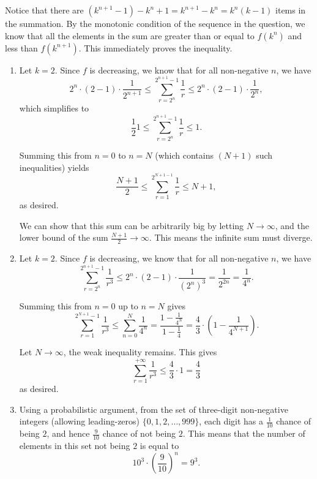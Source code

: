 \Question{\currfilebase}

Notice that there are \((k^{n + 1} - 1) - k^n + 1 = k^{n + 1} - k^n = k^n (k - 1)\) items in the summation. By the monotonic condition of the sequence in the question, we know that all the elements in the sum are greater than or equal to \(f(k^n)\) and less than \(f(k^{n + 1})\). This immediately proves the inequality.

\begin{enumerate}
    \item Let \(k = 2\). Since \(f\) is decreasing, we know that for all non-negative \(n\), we have
          \[
              2^n \cdot (2 - 1) \cdot \frac{1}{2^{n + 1}} \leq \sum_{r = 2^n}^{2^{n + 1} - 1} \frac{1}{r} \leq 2^n \cdot (2 - 1) \cdot \frac{1}{2^{n}},
          \]
          which simplifies to
          \[
              \frac{1}{2} 1 \leq \sum_{r = 2^n}^{2^{n + 1} - 1} \frac{1}{r} \leq 1.
          \]

          Summing this from \(n = 0\) to \(n = N\) (which contains \((N + 1)\) such inequalities) yields
          \[
              \frac{N + 1}{2} \leq \sum_{r = 1}^{2^{N + 1 - 1}} \frac{1}{r} \leq N + 1,
          \]
          as desired.

          We can show that this sum can be arbitrarily big by letting \(N \to \infty\), and the lower bound of the sum \(\frac{N + 1}{2} \to \infty\). This means the infinite sum must diverge.

    \item Let \(k = 2\). Since \(f\) is decreasing, we know that for all non-negative \(n\), we have
          \[
              \sum_{r = 2^n}^{2^{n + 1} - 1} \frac{1}{r^3} \leq 2^n \cdot (2 - 1) \cdot \frac{1}{(2^{n})^3} = \frac{1}{2^{2n}} = \frac{1}{4^n}.
          \]

          Summing this from \(n = 0\) up to \(n = N\) gives
          \[
              \sum_{r = 1}^{2^{N + 1} - 1} \frac{1}{r^3} \leq \sum_{n = 0}^{N} \frac{1}{4^n} = \frac{1 - \frac{1}{4^N}}{1 - \frac{1}{4}} = \frac{4}{3} \cdot \left(1 - \frac{1}{4^{N + 1}}\right).
          \]

          Let \(N \to \infty\), the weak inequality remains. This gives
          \[
              \sum_{r = 1}^{+\infty} \frac{1}{r^3} \leq \frac{4}{3} \cdot 1 = \frac{4}{3}
          \]
          as desired.

    \item Using a probabilistic argument, from the set of three-digit non-negative integers (allowing leading-zeros) \(\{0, 1, 2, \ldots, 999\}\), each digit has a \(\frac{1}{10}\) chance of being \(2\), and hence \(\frac{9}{10}\) chance of not being \(2\). This means that the number of elements in this set not being \(2\) is equal to
          \[
              10^3 \cdot \left(\frac{9}{10}\right)^n = 9^3.
          \]


\end{enumerate}
